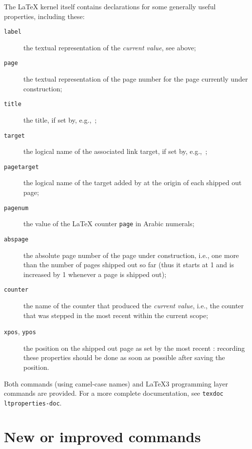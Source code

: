 \documentclass{ltnews}
\let\finalpagebreak\pagebreak %
\begin{document}
The
\LaTeX{} kernel itself contains
declarations for some generally useful properties,
including these:
\begin{description}
\item[\texttt{label}] the textual representation of the \emph{current
\textup{} value}, see above;

\item[\texttt{page}] the textual representation of the page number for
  the page currently under construction;

\item[\texttt{title}] the title, if set by, e.g.,~;

\item[\texttt{target}] the logical name of the associated link target,
  if set by, e.g.,~;

\item[\texttt{pagetarget}] the logical name of the target added by
   at the origin of each shipped out page;

\item[\texttt{pagenum}] the value of the \LaTeX{} counter
  \texttt{page} in Arabic numerals;

\item[\texttt{abspage}] the absolute page number of the page under
  construction, i.e., one more than the number of pages shipped out so
  far (thus it starts at 1 and is increased by 1 whenever a page is
  shipped out);

\item[\texttt{counter}] the name of the counter that produced the
  \emph{current \textup{} value}, i.e., the counter that was
  stepped in the most recent  within the current
  scope;

\item[\texttt{xpos}, \texttt{ypos}] the position on the shipped out
  page as set by the most recent : recording these
  properties should be done as soon as possible after saving the
  position.
\end{description}

Both \LaTeXe{} commands (using camel-case names) and
\LaTeX3 programming layer commands are provided.
%
For a more complete documentation, see \texttt{texdoc ltproperties-doc}.



\finalpagebreak

\section{New or improved commands}
\end{document}
